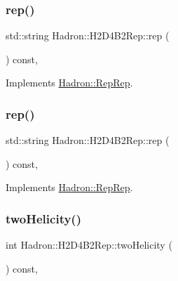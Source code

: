 \subsubsection{\texorpdfstring{rep()}{rep()}\hspace{0.1cm}{\footnotesize\ttfamily [2/3]}}
{\footnotesize\ttfamily std\+::string Hadron\+::\+H2\+D4\+B2\+Rep\+::rep (\begin{DoxyParamCaption}{ }\end{DoxyParamCaption}) const\hspace{0.3cm}{\ttfamily [inline]}, {\ttfamily [virtual]}}



Implements \mbox{\hyperlink{structHadron_1_1RepRep_ab3213025f6de249f7095892109575fde}{Hadron\+::\+Rep\+Rep}}.

\mbox{\label{structHadron_1_1H2D4B2Rep_a8d556a242b6426bf15612422a8e22ce6}} 
\subsubsection{\texorpdfstring{rep()}{rep()}\hspace{0.1cm}{\footnotesize\ttfamily [3/3]}}
{\footnotesize\ttfamily std\+::string Hadron\+::\+H2\+D4\+B2\+Rep\+::rep (\begin{DoxyParamCaption}{ }\end{DoxyParamCaption}) const\hspace{0.3cm}{\ttfamily [inline]}, {\ttfamily [virtual]}}



Implements \mbox{\hyperlink{structHadron_1_1RepRep_ab3213025f6de249f7095892109575fde}{Hadron\+::\+Rep\+Rep}}.

\mbox{\label{structHadron_1_1H2D4B2Rep_a21f6e9059862c9e6f8b6d5cbb10d8b80}} 
\subsubsection{\texorpdfstring{twoHelicity()}{twoHelicity()}\hspace{0.1cm}{\footnotesize\ttfamily [1/2]}}
{\footnotesize\ttfamily int Hadron\+::\+H2\+D4\+B2\+Rep\+::two\+Helicity (\begin{DoxyParamCaption}{ }\end{DoxyParamCaption}) const\hspace{0.3cm}{\ttfamily [inline]}, {\ttfamily [virtual]}}

